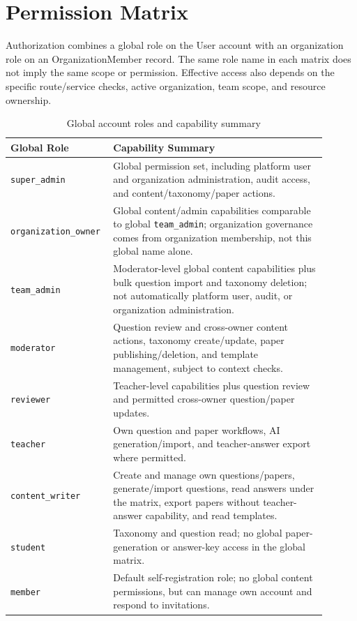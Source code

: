 \section{Permission Matrix}

Authorization combines a global role on the User account with an organization role on an OrganizationMember record. The same role name in each matrix does not imply the same scope or permission. Effective access also depends on the specific route/service checks, active organization, team scope, and resource ownership.

\begin{table}[H]
    \centering
    \caption{Global account roles and capability summary}
    \label{tab:global-role-permissions}
    \begin{tabular}{|p{0.25\linewidth}|p{0.65\linewidth}|}
        \hline
        \textbf{Global Role} & \textbf{Capability Summary} \\
        \hline
        \texttt{super\_admin} & Global permission set, including platform user and organization administration, audit access, and content/taxonomy/paper actions. \\
        \hline
        \texttt{organization\_owner} & Global content/admin capabilities comparable to global \texttt{team\_admin}; organization governance comes from organization membership, not this global name alone. \\
        \hline
        \texttt{team\_admin} & Moderator-level global content capabilities plus bulk question import and taxonomy deletion; not automatically platform user, audit, or organization administration. \\
        \hline
        \texttt{moderator} & Question review and cross-owner content actions, taxonomy create/update, paper publishing/deletion, and template management, subject to context checks. \\
        \hline
        \texttt{reviewer} & Teacher-level capabilities plus question review and permitted cross-owner question/paper updates. \\
        \hline
        \texttt{teacher} & Own question and paper workflows, AI generation/import, and teacher-answer export where permitted. \\
        \hline
        \texttt{content\_writer} & Create and manage own questions/papers, generate/import questions, read answers under the matrix, export papers without teacher-answer capability, and read templates. \\
        \hline
        \texttt{student} & Taxonomy and question read; no global paper-generation or answer-key access in the global matrix. \\
        \hline
        \texttt{member} & Default self-registration role; no global content permissions, but can manage own account and respond to invitations. \\
        \hline
    \end{tabular}
\end{table}

